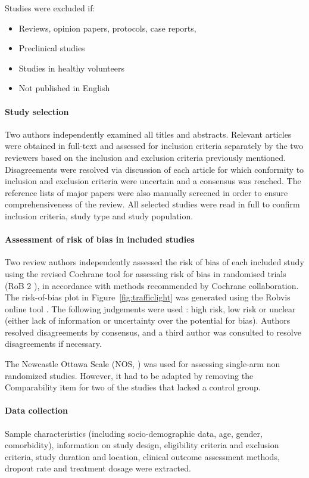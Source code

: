 Studies were excluded if: 
\begin{itemize}
\setlength\itemsep{-0.5em}
    \item Reviews, opinion papers, protocols, case reports,
    \item Preclinical studies
    \item Studies in healthy volunteers
    \item Not published in English
\end{itemize}

\paragraph{Study selection}

Two authors independently examined all titles and abstracts. Relevant articles were obtained in full-text and assessed for inclusion criteria separately by the two reviewers based on the inclusion and exclusion criteria previously mentioned. Disagreements were resolved via discussion of each article for which conformity to inclusion and exclusion criteria were uncertain and a consensus was reached. The reference lists of major papers were also manually screened in order to ensure comprehensiveness of the review. All selected studies were read in full to confirm inclusion criteria, study type and study population.

\paragraph{Assessment of risk of bias in included studies} 

Two review authors independently assessed the risk of bias of each included study using the revised Cochrane tool for assessing risk of bias in randomised trials (RoB 2 \cite{sterne2019rob}), in accordance with methods recommended by Cochrane collaboration. The risk-of-bias plot in Figure~\ref{fig:trafficlight} was generated using the Robvis online tool \cite{mcguinness_risk--bias_2021}. The following judgements were used : high risk, low risk or unclear (either lack of information or uncertainty over the potential for bias). Authors resolved disagreements by consensus, and a third author was consulted to resolve disagreements if necessary.

The Newcastle Ottawa Scale (NOS, \cite{peterson2011newcastle}) was used for assessing single-arm non randomized studies. However, it had to be adapted by removing the Comparability item for two of the studies that lacked a control group.

\paragraph{Data collection}

Sample characteristics (including socio-demographic data, age, gender, comorbidity), information on study design, eligibility criteria and exclusion criteria, study duration and location, clinical outcome assessment methods, dropout rate and treatment dosage were extracted.